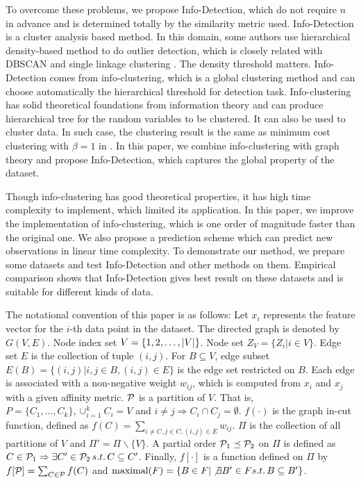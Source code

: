 \documentclass[runningheads]{llncs}
\begin{document}
To overcome these problems, we propose Info-Detection, which do not require $n$ in advance and is determined totally by the similarity metric used.  
Info-Detection is a cluster analysis based method. In this domain, some authors use hierarchical density-based method to do outlier detection, which is closely related with DBSCAN and single linkage clustering \cite{Campello}. The density threshold matters. Info-Detection comes from info-clustering, which is a global clustering method \cite{RN1} and can choose automatically the hierarchical threshold for detection task. Info-clustering has solid theoretical foundations from information theory and can produce hierarchical tree for the random variables to be clustered. It can also be used to cluster data. In such case, the clustering result is the same as minimum cost clustering with $\beta = 1$ in \cite{RN7}. In this paper, we combine info-clustering with graph theory and propose Info-Detection, which captures the global property of the dataset.

Though info-clustering has good theoretical properties, it has high time complexity to implement, which limited its application. In this paper, we improve the implementation of info-clustering, which is one order of magnitude faster than the original one. We also propose a prediction scheme which can predict new observations in linear time complexity. To demonstrate our method, we prepare some datasets and test Info-Detection and other methods on them. Empirical comparison shows that Info-Detection gives best result on these datasets and is suitable for different kinds of data.

The notational convention of this paper is as follows: Let $x_i$ represents the feature vector for the $i$-th data point in the dataset. The directed graph is denoted by $G(V, E)$. Node index set $V=\{1, 2,\dots, \abs{V}\}$. Node set $Z_V=\{Z_i | i \in V\}$. Edge set $E$ is the collection of tuple $(i,j)$. For $B\subseteq V$, edge subset $E(B) = \{(i,j)| i, j \in B,(i,j)\in E\}$ is the edge set restricted on $B$. Each edge is associated with a non-negative weight $w_{ij}$, which is computed from $x_i$ and $x_j$ with a given affinity metric. $\P$ is a partition of $V$. That is, $P=\{C_1, \dots, C_k\}, \cup_{i=1}^k C_i=V$ and $i\neq j \Rightarrow C_i \cap C_j =\emptyset $. $f(\cdot)$ is the graph in-cut function, defined as $f(C)=\sum_{i \neq C, j\in C, (i,j) \in E} w_{ij}$. $\Pi$ is the collection of all partitions of $V$ and $\Pi'=\Pi\backslash\{V\}$. A partial order $ \P_1 \preceq \P_2$ on $\Pi$ is defined as
$C \in \P_1 \Rightarrow \exists C' \in \P_2 \, s.t. \, C \subseteq C'$.
Finally, $f[\cdot]$ is a function defined on $\Pi$ by $f[\P]=\sum_{C\in \P}f(C)$ and $\textrm{maximal} (F)=\{B\in F | \not\exists B' \in F s.t.\, B \subseteq B'\}$.
\end{document}
